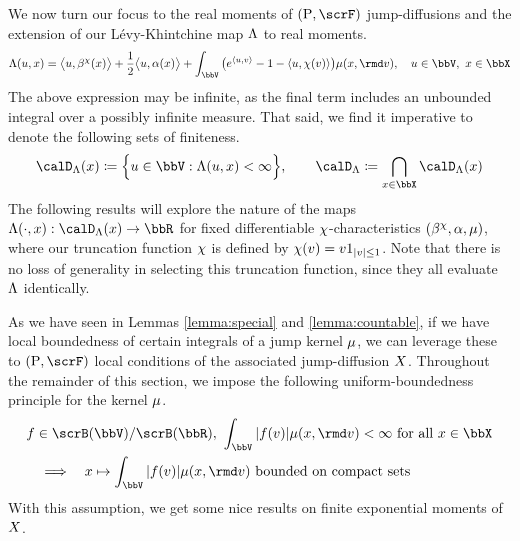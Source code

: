 We now turn our focus to the real moments of $(\Prb, \scrF)$ jump-diffusions and the extension of our L\'evy-Khintchine map $\Lambda$ to real moments.
\begin{equation*}
  \ode(\momentVar, \stateVar) = \bprj{\momentVar}{\affDrift^\trunc(\stateVar)} + \frac12\bprj{\momentVar}{\affDiff(\stateVar)} + \int_\vecSpace \big( e^\prj{\momentVar}{\markVar} - 1 - \prj{\momentVar}{\trunc(\markVar)} \big) \affJump(\stateVar, \rmd\markVar), \quad \momentVar \in \vecSpace, ~ \stateVar \in \stateSpace
\end{equation*}
The above expression may be infinite, as the final term includes an unbounded integral over a possibly infinite measure.
That said, we find it imperative to denote the following sets of finiteness.
\begin{equation}
  \label{eq:odeSpace-general}
  \odeSpace(\stateVar) \defeq \Big\{ \momentVar \in \vecSpace : \ode(\momentVar, \stateVar) < \infty \Big\}, \qquad
  \odeSpace \defeq \bigcap_{\stateVar \in \stateSpace} \odeSpace(\stateVar)
\end{equation}
The following results will explore the nature of the maps $\ode(\cdot,\stateVar): \odeSpace(\stateVar) \rightarrow \bbR$ for fixed differentiable $\chi$-characteristics $(\beta^\chi, \alpha, \mu)$, where our truncation function $\chi$ is defined by $\chi(v) = v 1_{|v|\leq 1}$.
Note that there is no loss of generality in selecting this truncation function, since they all evaluate $\Lambda$ identically.





As we have seen in Lemmas \ref{lemma:special} and \ref{lemma:countable}, if we have local boundedness of certain integrals of a jump kernel $\mu$, we can leverage these to $(\Prb, \scrF)$ local conditions of the associated jump-diffusion $X$.
Throughout the remainder of this section, we impose the following uniform-boundedness principle for the kernel $\mu$.
\begin{equation}
  \label{eq:affJump-regularity}
  \begin{aligned}
    &f \in \scrB(\vecSpace)/\scrB(\bbR), ~ \int_\vecSpace |f(\markVar)| \affJump(\stateVar, \rmd\markVar) < \infty \text{ for all } \stateVar \in \stateSpace \\
    &\quad\Longrightarrow\quad \stateVar \mapsto \int_\vecSpace |f(\markVar)| \affJump(\stateVar, \rmd\markVar) \text{ bounded on compact sets}
  \end{aligned}
\end{equation}
With this assumption, we get some nice results on finite exponential moments of $X$.





